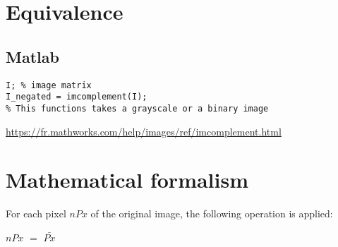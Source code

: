 \documentclass[12pt,a4paper]{article}
\begin{document}



\section*{Equivalence}
\subsection*{Matlab}

\lstset{language=Matlab}
\begin{lstlisting}
I; % image matrix
I_negated = imcomplement(I);
% This functions takes a grayscale or a binary image

\end{lstlisting}

\url{https://fr.mathworks.com/help/images/ref/imcomplement.html}



\section*{Mathematical formalism}

For each pixel $nPx$ of the original image, the following operation is applied:


\centering

$\displaystyle nPx $ 	$\textstyle =$ 	$\displaystyle \bar{Px}$

\vspace{0.5cm}
\end{document}
